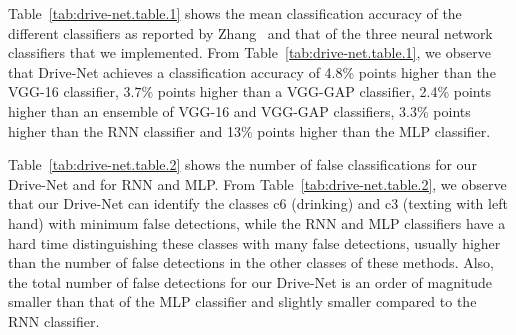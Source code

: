 Table~\ref{tab:drive-net.table.1} shows the mean classification accuracy of the different classifiers as reported by Zhang~\cite{zhang_Apply_2016} and that of the three neural network classifiers that we implemented. From Table~\ref{tab:drive-net.table.1}, we observe that Drive-Net achieves a classification accuracy of 4.8\% points higher than the VGG-16 classifier, $3.7\% $ points higher than a VGG-GAP classifier, 2.4\% points higher than an ensemble of VGG-16 and VGG-GAP classifiers, 3.3\% points higher than the RNN classifier and 13\% points higher than the MLP classifier.

Table~\ref{tab:drive-net.table.2} shows the number of false classifications for our Drive-Net and for RNN and MLP\@. From Table~\ref{tab:drive-net.table.2}, we observe that our Drive-Net can identify the classes c6 (drinking) and c3 (texting with left hand) with minimum false detections, while the RNN and MLP classifiers have a hard time distinguishing these classes with many false detections, usually higher than the number of false detections in the other classes of these methods. Also, the total number of false detections for our Drive-Net is an order of magnitude smaller than that of the MLP classifier and slightly smaller compared to the RNN classifier.


